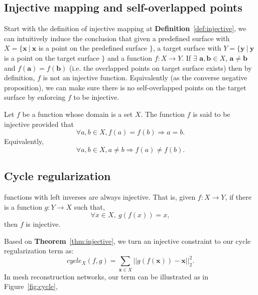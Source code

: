 \subsection{Injective mapping and self-overlapped points}
\label{subsec:inj}
Start with the definition of injective mapping at \textbf{Definition}~\ref{def:injective}, we can intuitively induce the conclusion that given a predefined surface with $ X =\{\mathbf{x}~|~\mathbf{x}$ is a point on the predefined surface $ \} $, a target surface with $ Y =\{\mathbf{y}~|~\mathbf{y}$ is a point on the target surface $ \} $ and a function $f:X \rightarrow Y$. If $\exists$ $ \mathbf{a},\mathbf{b} \in X$, $\mathbf{a} \neq \mathbf{b}$ and $f(\mathbf{a}) = f(\mathbf{b})$ (i.e. the overlapped points on target surface exists) then by definition, $f$ is not an injective function. Equivalently (as the converse negative proposition), we can make sure there is no self-overlapped points on the target surface by enforcing $f$ to be injective.
\begin{m_def}
\label{def:injective}
Let $f$ be a function whose domain is a set $X$. The function $f$ is said to be injective provided that
\begin{equation}
\forall a,b \in X, f(a) = f(b) \Rightarrow a = b.
\end{equation}
Equivalently, 
\begin{equation}
\forall a,b \in X, a \neq b \Rightarrow f(a) \neq f(b).
\end{equation}
\end{m_def}

\subsection{Cycle regularization}
\label{subsec:cyclereg}
\begin{m_thm}
\label{thm:injective}
functions with left inverses are always injective. That is, given $f:X \rightarrow Y$, if there is a function $g:Y \rightarrow X$ such that,
\begin{equation}
\label{equ:injective}
\forall x \in X,~g(f(x)) = x,
\end{equation}
then $f$ is injective.
\end{m_thm}

Based on \textbf{Theorem}~\ref{thm:injective}, we turn an injective constraint to our cycle regularization term as:
\begin{equation}
\label{equ:cycle_term}
cycle_X(f,g)=\sum_{\mathbf{x}\in X}||g(f(\mathbf{x})) - \mathbf{x}||_2^2.
\end{equation}
In mesh reconstruction networks, our term can be illustrated as in Figure~\ref{fig:cycle}, 

